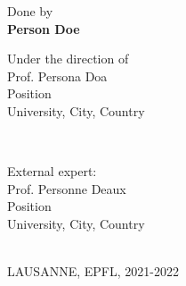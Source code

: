 \begin{titlepage}
Done by\\[0.5cm]

\textbf{\large Person Doe}\\[0.75cm]

\parbox{\textwidth}{
    \centering Under the direction of \\
    Prof. Persona Doa \\
    Position \\
    University, City, Country
}\\[0.75cm] 

\parbox{\textwidth}{
    \centering External expert: \\
    Prof. Personne Deaux \\
    Position \\
    University, City, Country
}\\[0.75cm]


{LAUSANNE, EPFL, 2021-2022}

\vfill %

\end{titlepage}